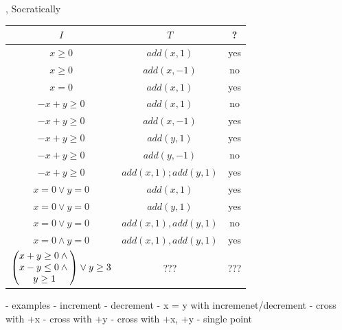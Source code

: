 \documentclass[xcolor={dvipsnames,svgnames,table}]{beamer}
\begin{document}
\begin{frame}{\iconfluence{}, Socratically}
  \begin{center}
    \begin{tabular}{c|c|c}
      $I$                 & $T$                    & \iconfluent{}? \\\hline\hline
      $x \geq 0$          & $add(x, 1)$            & \pause yes \pause \\\hline
      $x \geq 0$          & $add(x, -1)$           & \pause no  \pause \\\hline
      $x = 0$             & $add(x, 1)$            & \pause yes \pause \\\hline
      $-x + y \geq 0$     & $add(x, 1)$            & \pause no  \pause \\\hline
      $-x + y \geq 0$     & $add(x, -1)$           & \pause yes \pause \\\hline
      $-x + y \geq 0$     & $add(y, 1)$            & \pause yes \pause \\\hline
      $-x + y \geq 0$     & $add(y, -1)$           & \pause no  \pause \\\hline
      $-x + y \geq 0$     & $add(x, 1); add(y, 1)$ & \pause yes \pause \\\hline
      $x = 0 \lor y = 0$  & $add(x, 1)$            & \pause yes \pause \\\hline
      $x = 0 \lor y = 0$  & $add(y, 1)$            & \pause yes \pause \\\hline
      $x = 0 \lor y = 0$  & $add(x, 1), add(y, 1)$ & \pause no  \pause \\\hline
      $x = 0 \land y = 0$ & $add(x, 1), add(y, 1)$ & \pause yes \pause \\\hline
      $\begin{pmatrix}
        x + y \geq 0 \land {} \\
        x - y \leq 0 \land {} \\
        y \geq 1
       \end{pmatrix} \lor y \geq 3$ & ???  & ??? \\
    \end{tabular}
  \end{center}
\end{frame}

\begin{frame}
  - examples
  - increment
  - decrement
  - x = y with incremenet/decrement
  - cross with +x
  - cross with +y
  - cross with +x, +y
  - single point
\end{frame}
\end{document}
